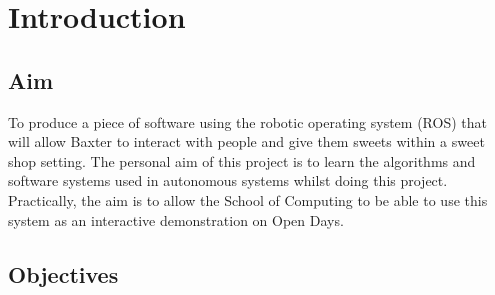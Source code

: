 \chapter{Introduction}
\label{chapter1}
\setcounter{page}{1}
\section{Aim}
To produce a piece of software using the robotic operating system (ROS) that will allow Baxter to interact with people and give them sweets within a sweet shop setting. The personal aim of this project is to learn the algorithms and software systems used in autonomous systems whilst doing this project. Practically, the aim is to allow the School of Computing to be able to use this system as an interactive demonstration on Open Days.
\section{Objectives}

